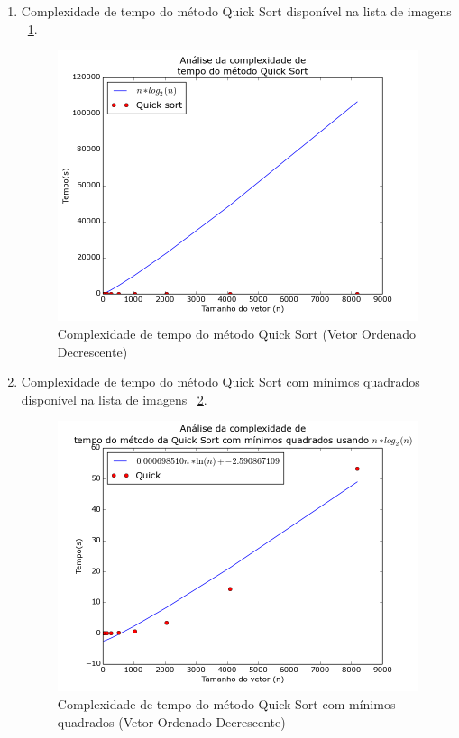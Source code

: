 \documentclass[12pt,a4paper,twoside]{report}
\begin{document}
	\begin{enumerate}
	


					\item Complexidade de tempo do método Quick Sort disponível na lista de imagens ~\ref{fig:QuickPlot2OD}.
					\begin{figure}[!h]
						\centering
						\includegraphics[scale=0.6]{../imagens/Quick/Quick_plot_2_ordenado_decrescente.png}
						\caption{Complexidade de tempo do método Quick Sort (Vetor Ordenado Decrescente) \label{fig:QuickPlot2OD}}
					\end{figure}


					\item Complexidade de tempo do método Quick Sort com mínimos quadrados disponível na lista de imagens  ~\ref{fig:QuickPlot3OD}.
					\begin{figure}[!h]
						\centering
						\includegraphics[scale=0.6]{../imagens/Quick/Quick_plot_3_ordenado_decrescente.png}
						\caption{Complexidade de tempo do método Quick Sort com mínimos quadrados (Vetor Ordenado Decrescente) \label{fig:QuickPlot3OD}}
					\end{figure}

				\end{enumerate}
\end{document}
